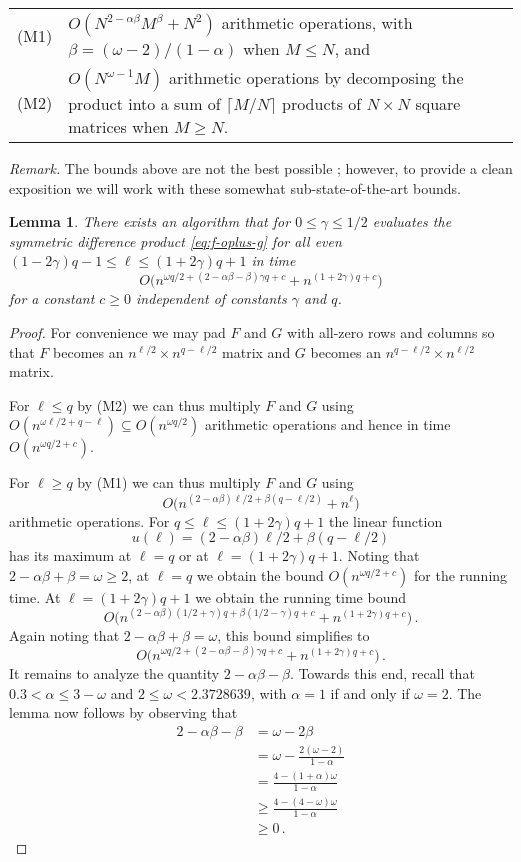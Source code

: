 \documentclass{amsart}
\newtheorem{Lem}{Lemma}
\begin{document}
\medskip
\noindent
\begin{tabular}{@{}l@{\ \ }p{11.5cm}@{}}
(M1) & $O(N^{2-\alpha \beta}M^\beta+N^2)$ arithmetic operations, with $\beta=(\omega-2)/(1-\alpha)$ when $M\leq N$, and\\[\medskipamount]
(M2) & $O(N^{\omega-1}M)$ arithmetic operations 
by decomposing the product into a sum of $\lceil M/N\rceil$ products 
of $N\times N$ square matrices when $M\geq N$.
\end{tabular}
\medskip

\noindent
{\em Remark.} The bounds above are not the best possible \cite{LG12}; 
however, to provide a clean exposition we will work with these 
somewhat sub-state-of-the-art bounds.

\begin{Lem}
\label{lem:fsdp}
There exists an algorithm that for $0\leq\gamma\leq 1/2$
evaluates the symmetric difference product \eqref{eq:f-oplus-g} 
for all even $(1-2\gamma)q-1\leq\ell\leq(1+2\gamma)q+1$ in time 
\[
O\bigl(n^{\omega q/2+(2-\alpha\beta-\beta)\gamma q+c}+n^{(1+2\gamma)q+c}\bigr)
\] 
for a constant $c\geq 0$ independent of constants $\gamma$ and $q$. 
\end{Lem}
\begin{proof}
For convenience we may pad $F$ and $G$ with all-zero rows and columns 
so that $F$ becomes an $n^{\ell/2}\times n^{q-\ell/2}$ matrix
and $G$ becomes an $n^{q-\ell/2}\times n^{\ell/2}$ matrix.

For $\ell\leq q$ by (M2) we can thus multiply $F$ and $G$ using
$O(n^{\omega \ell/2+q-\ell})\subseteq O(n^{\omega q/2})$ arithmetic 
operations and hence in time $O(n^{\omega q/2+c})$. 

For $\ell\geq q$ by (M1) we can thus multiply $F$ and $G$ using 
\[
O\bigl(n^{(2-\alpha\beta)\ell/2+\beta(q-\ell/2)}+n^\ell\bigr)
\]
arithmetic operations.
For $q\leq\ell\leq(1+2\gamma)q+1$ the linear function 
\[
u(\ell)=(2-\alpha\beta)\ell/2+\beta(q-\ell/2)
\]
has its maximum at $\ell = q$ or at $\ell=(1+2\gamma)q+1$. 
Noting that $2-\alpha\beta+\beta=\omega\geq 2$, at $\ell=q$ we
obtain the bound $O(n^{\omega q/2+c})$ for the running time.
At $\ell=(1+2\gamma)q+1$ we obtain the running time bound 
\[
O\bigl(n^{(2-\alpha\beta)(1/2+\gamma)q+\beta(1/2-\gamma)q+c}+n^{(1+2\gamma)q+c}\bigr)\,.
\] 
Again noting that $2-\alpha\beta+\beta=\omega$, this bound simplifies to 
\[
O\bigl(n^{\omega q/2+(2-\alpha\beta-\beta)\gamma q+c}+n^{(1+2\gamma)q+c}\bigr)\,.
\] 
It remains to analyze the quantity $2-\alpha\beta-\beta$. 
Towards this end, recall that $0.3<\alpha\leq 3-\omega$ and 
$2\leq\omega<2.3728639$, with $\alpha=1$ if and only 
if $\omega=2$. The lemma now follows by observing that 
\[
\begin{split}
2-\alpha\beta-\beta 
&=\omega-2\beta\\
&=\omega-\frac{2(\omega-2)}{1-\alpha}\\
&= \frac{4-(1+\alpha)\omega}{1-\alpha}\\
&\geq \frac{4-(4-\omega)\omega}{1-\alpha}\\
&\geq 0\,.
\end{split}
\]
\end{proof}
\end{document}
